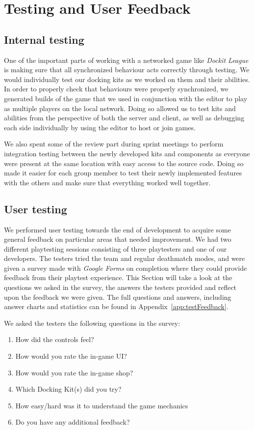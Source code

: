 \chapter{Testing and User Feedback}
\label{chap:testing}

\section{Internal testing}
One of the important parts of working with a networked game like \emph{Dockit League} is making sure that all synchronized behaviour acts correctly through testing. We would individually test our docking kits as we worked on them and their abilities. In order to properly check that behaviours were properly synchronized, we generated builds of the game that we used in conjunction with the editor to play as multiple players on the local network. Doing so allowed us to test kits and abilities from the perspective of both the server and client, as well as debugging each side individually by using the editor to host or join games.

We also spent some of the review part during sprint meetings to perform integration testing between the newly developed kits and components as everyone were present at the same location with easy access to the source code. Doing so made it easier for each group member to test their newly implemented features with the others and make sure that everything worked well together. 


\section{User testing}
We performed user testing towards the end of development to acquire some general feedback on particular areas that needed improvement. We had two different playtesting sessions consisting of three playtesters and one of our developers. The testers tried the team and regular deathmatch modes, and were given a survey made with \emph{Google Forms} on completion where they could provide feedback from their playtest experience. This Section will take a look at the questions we asked in the survey, the answers the testers provided and reflect upon the feedback we were given. The full questions and answers, including answer charts and statistics can be found in Appendix~\ref{app:testFeedback}.

We asked the testers the following questions in the survey:
\begin{enumerate}
    \item How did the controls feel?
    \item How would you rate the in-game UI?
    \item How would you rate the in-game shop?
    \item Which Docking Kit(s) did you try?
    \item How easy/hard was it to understand the game mechanics
    \item Do you have any additional feedback?
\end{enumerate}
 
